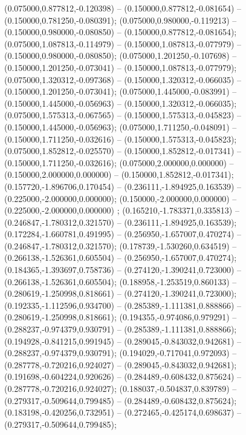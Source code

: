  (0.075000,0.877812,-0.120398) -- (0.150000,0.877812,-0.081654) -- (0.150000,0.781250,-0.080391);
 (0.075000,0.980000,-0.119213) -- (0.150000,0.980000,-0.080850) -- (0.150000,0.877812,-0.081654);
 (0.075000,1.087813,-0.114979) -- (0.150000,1.087813,-0.077979) -- (0.150000,0.980000,-0.080850);
 (0.075000,1.201250,-0.107698) -- (0.150000,1.201250,-0.073041) -- (0.150000,1.087813,-0.077979);
 (0.075000,1.320312,-0.097368) -- (0.150000,1.320312,-0.066035) -- (0.150000,1.201250,-0.073041);
 (0.075000,1.445000,-0.083991) -- (0.150000,1.445000,-0.056963) -- (0.150000,1.320312,-0.066035);
 (0.075000,1.575313,-0.067565) -- (0.150000,1.575313,-0.045823) -- (0.150000,1.445000,-0.056963);
 (0.075000,1.711250,-0.048091) -- (0.150000,1.711250,-0.032616) -- (0.150000,1.575313,-0.045823);
 (0.075000,1.852812,-0.025570) -- (0.150000,1.852812,-0.017341) -- (0.150000,1.711250,-0.032616);
 (0.075000,2.000000,0.000000) -- (0.150000,2.000000,0.000000) -- (0.150000,1.852812,-0.017341);
 (0.157720,-1.896706,0.170454) -- (0.236111,-1.894925,0.163539) -- (0.225000,-2.000000,0.000000);
 (0.150000,-2.000000,0.000000) -- (0.225000,-2.000000,0.000000) ;
 (0.165210,-1.783371,0.335813) -- (0.246847,-1.780312,0.321570) -- (0.236111,-1.894925,0.163539);
 (0.172284,-1.660781,0.491995) -- (0.256950,-1.657007,0.470274) -- (0.246847,-1.780312,0.321570);
 (0.178739,-1.530260,0.634519) -- (0.266138,-1.526361,0.605504) -- (0.256950,-1.657007,0.470274);
 (0.184365,-1.393697,0.758736) -- (0.274120,-1.390241,0.723000) -- (0.266138,-1.526361,0.605504);
 (0.188958,-1.253519,0.860133) -- (0.280619,-1.250998,0.818661) -- (0.274120,-1.390241,0.723000);
 (0.192335,-1.112596,0.934700) -- (0.285389,-1.111381,0.888866) -- (0.280619,-1.250998,0.818661);
 (0.194355,-0.974086,0.979291) -- (0.288237,-0.974379,0.930791) -- (0.285389,-1.111381,0.888866);
 (0.194928,-0.841215,0.991945) -- (0.289045,-0.843032,0.942681) -- (0.288237,-0.974379,0.930791);
 (0.194029,-0.717041,0.972093) -- (0.287778,-0.720216,0.924027) -- (0.289045,-0.843032,0.942681);
 (0.191698,-0.604224,0.920626) -- (0.284489,-0.608432,0.875624) -- (0.287778,-0.720216,0.924027);
 (0.188037,-0.504837,0.839789) -- (0.279317,-0.509644,0.799485) -- (0.284489,-0.608432,0.875624);
 (0.183198,-0.420256,0.732951) -- (0.272465,-0.425174,0.698637) -- (0.279317,-0.509644,0.799485);
